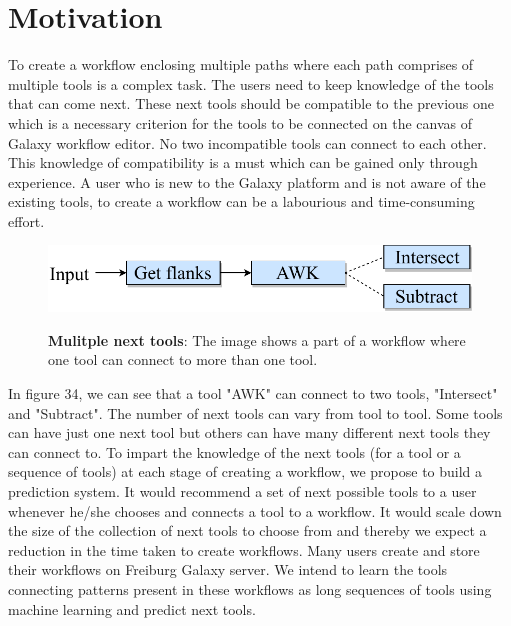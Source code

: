 \chapter{Motivation}\label{chap:motivation_wf}

To create a workflow enclosing multiple paths where each path comprises of multiple tools is a complex task. The users need to keep knowledge of the tools that can come next. These next tools should be compatible to the previous one which is a necessary criterion for the tools to be connected on the canvas of Galaxy workflow editor. No two incompatible tools can connect to each other. This knowledge of compatibility is a must which can be gained only through experience. A user who is new to the Galaxy platform and is not aware of the existing tools, to create a workflow can be a labourious and time-consuming effort. 

\begin{figure}[h]
\begin{centering}
    {\includegraphics[scale=0.7]{figures/multiple_next_tools_45cee2961bc05b20.pdf}}
    \caption[Multiple next tools]{\textbf{Mulitple next tools}: The image shows a part of a workflow where one tool can connect to more than one tool.}
\end{centering}
\end{figure}

In figure 34, we can see that a tool "AWK" can connect to two tools, "Intersect" and "Subtract". The number of next tools can vary from tool to tool. Some tools can have just one next tool but others can have many different next tools they can connect to. To impart the knowledge of the next tools (for a tool or a sequence of tools) at each stage of creating a workflow, we propose to build a prediction system. It would recommend a set of next possible tools to a user whenever he/she chooses and connects a tool to a workflow. It would scale down the size of the collection of next tools to choose from and thereby we expect a reduction in the time taken to create workflows. Many users create and store their workflows on Freiburg Galaxy server. We intend to learn the tools connecting patterns present in these workflows as long sequences of tools using machine learning and predict next tools.